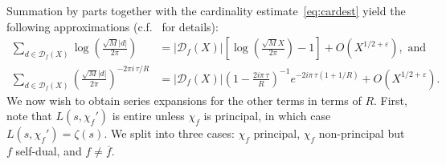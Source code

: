 \documentclass[11pt,reqno]{amsart} \usepackage{fullpage}
\newcommand{\vep}{\varepsilon}
\newcommand{\Lchi}[2][]{L(#2,\chi_f#1)}
\newcommand{\D}{\mathcal D_f}
\numberwithin{equation}{section}
\begin{document}
Summation by parts together with the cardinality estimate~\eqref{eq:cardest} yield the
following approximations (c.f.~\cite[Lemma A.2]{HMM} for details):
\begin{align}
  \sum_{d\in\D(X)}\log\left(\frac{\sqrt M |d|}{2\pi}\right)
  &=\left|\D(X)\right|
    \left[\log\left(\frac{\sqrt M X}{2\pi}\right)-1\right]+O\left(X^{1/2+\vep}\right),
    \text{ and} \\
  \sum_{d\in\D(X)}
  \left(\frac{\sqrt M |d|}{2\pi}\right)^{-2\pi i\,\tau/R}
  &=\left|\D(X)\right|\left(1-\frac{2i\pi\,\tau}{R}\right)^{-1}e^{-2i\pi\,\tau(1+1/R)}
    +O\left(X^{1/2+\vep}\right).
\end{align}
We now wish to obtain series expansions for the other terms in terms of $R$.
First, note that $\Lchi[']{s}$ is entire unless $\chi_f$ is principal, in
which case $\Lchi[']{s}=\zeta(s)$. We split into three cases: $\chi_f$ principal, $\chi_f$
non-principal but $f$ self-dual, and $f\ne\overline f$.
\end{document}

